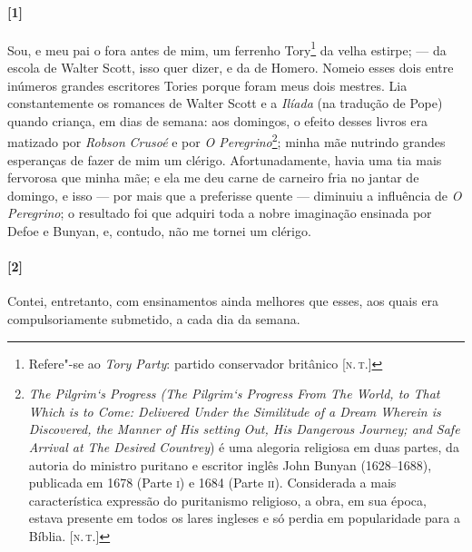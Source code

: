 \begin{quote}
\end{quote}

\paragraph{[1]} Sou, e meu pai o fora antes de mim, um ferrenho Tory\footnote{Refere"-se
  ao \emph{Tory Party}: partido conservador britânico {[}\textsc{n.\,t.}{]}} da
velha estirpe; --- da escola de Walter Scott, isso quer dizer, e da de
Homero. Nomeio esses dois entre inúmeros grandes escritores Tories
porque foram meus dois mestres. Lia constantemente os romances de Walter
Scott e a \emph{Ilíada} (na tradução de Pope) quando criança, em dias de
semana: aos domingos, o efeito desses livros era matizado por
\emph{Robson} \emph{Crusoé} e por \emph{O Peregrino}\footnote{\emph{The
  Pilgrim`s Progress (The Pilgrim`s Progress From The World, to That
  Which is to Come: Delivered Under the Similitude of a Dream Wherein is
  Discovered, the Manner of His setting Out, His Dangerous Journey; and
  Safe Arrival at The Desired Countrey}) é uma alegoria religiosa em
  duas partes, da autoria do ministro puritano e escritor inglês John
  Bunyan (1628--1688), publicada em 1678 (Parte \textsc{i}) e 1684 (Parte \textsc{ii}).
  Considerada a mais característica expressão do puritanismo religioso,
  a obra, em sua época, estava presente em todos os lares ingleses e só
  perdia em popularidade para a Bíblia. {[}\textsc{n.\,t.}{]}}; minha mãe
nutrindo grandes esperanças de fazer de mim um clérigo. Afortunadamente,
havia uma tia mais fervorosa que minha mãe; e ela me deu carne de
carneiro fria no jantar de domingo, e isso --- por mais que a preferisse
quente --- diminuiu a influência de \emph{O Peregrino}; o resultado foi
que adquiri toda a nobre imaginação ensinada por Defoe e Bunyan, e,
contudo, não me tornei um clérigo.

\paragraph{[2]} Contei, entretanto, com ensinamentos ainda melhores que esses, aos
quais era compulsoriamente submetido, a cada dia da semana.

